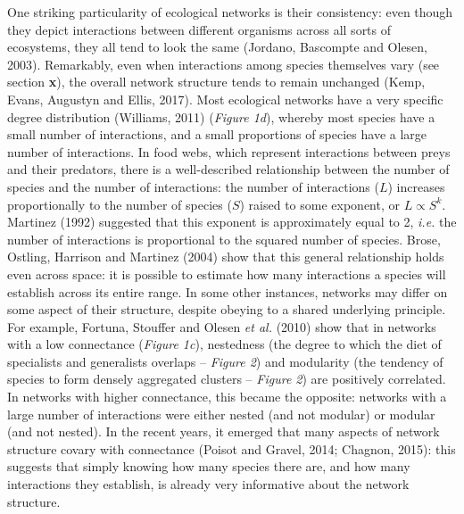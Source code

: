 \documentclass[12pt]{article}
\begin{document}
One striking particularity of ecological networks is their consistency:
even though they depict interactions between different organisms across
all sorts of ecosystems, they all tend to look the same (Jordano,
Bascompte and Olesen, 2003). Remarkably, even when interactions among
species themselves vary (see section \textbf{x}), the overall network
structure tends to remain unchanged (Kemp, Evans, Augustyn and Ellis,
2017). Most ecological networks have a very specific degree distribution
(Williams, 2011) (\emph{Figure 1d}), whereby most species have a small
number of interactions, and a small proportions of species have a large
number of interactions. In food webs, which represent interactions
between preys and their predators, there is a well-described
relationship between the number of species and the number of
interactions: the number of interactions (\(L\)) increases
proportionally to the number of species (\(S\)) raised to some exponent,
or \(L \propto S^k\). Martinez (1992) suggested that this exponent is
approximately equal to 2, \emph{i.e.} the number of interactions is
proportional to the squared number of species. Brose, Ostling, Harrison
and Martinez (2004) show that this general relationship holds even
across space: it is possible to estimate how many interactions a species
will establish across its entire range. In some other instances,
networks may differ on some aspect of their structure, despite obeying
to a shared underlying principle. For example, Fortuna, Stouffer and
Olesen \emph{et al.} (2010) show that in networks with a low connectance
(\emph{Figure 1c}), nestedness (the degree to which the diet of
specialists and generalists overlaps -- \emph{Figure 2}) and modularity
(the tendency of species to form densely aggregated clusters --
\emph{Figure 2}) are positively correlated. In networks with higher
connectance, this became the opposite: networks with a large number of
interactions were either nested (and not modular) or modular (and not
nested). In the recent years, it emerged that many aspects of network
structure covary with connectance (Poisot and Gravel, 2014; Chagnon,
2015): this suggests that simply knowing how many species there are, and
how many interactions they establish, is already very informative about
the network structure.
\end{document}
